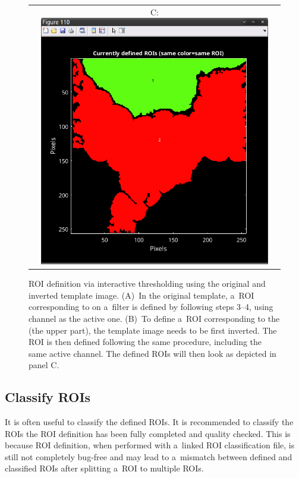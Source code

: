 \begin{figure}[!ht]
\begin{tabular}{ccc}
&
C: \includegraphics[scale=0.19]{figs3/LANS-roi-interactive8}
\end{tabular}
\caption{\label{fig:interactive-invert}%
ROI definition via interactive thresholding using the original and inverted template image. (A)~In the original template, a~ROI corresponding to  on a~filter is defined by following steps 3--4, using  channel as the active one. (B)~To define a~ROI corresponding to the  (the upper part), the template image needs to be first inverted. The ROI is then defined following the same procedure, including the same active channel. The defined ROIs will then look as depicted in panel C.}
\end{figure}


\subsection{Classify ROIs}

It is often useful to classify the defined ROIs. It is recommended to classify the ROIs  the ROI definition has been fully completed and quality checked. This is because ROI definition, when performed with a~linked ROI classification file, is still not completely bug-free and may lead to a~mismatch between defined and classified ROIs after splitting a~ROI to multiple ROIs.

